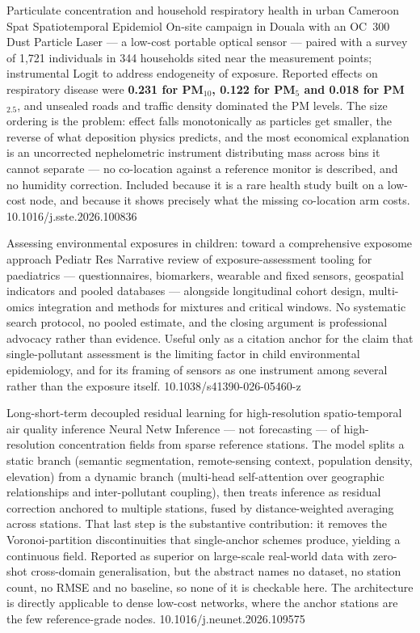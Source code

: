 \documentclass[10pt]{article}
\begin{document}
{Particulate concentration and household respiratory health in urban Cameroon}
{Spat Spatiotemporal Epidemiol}
{On-site campaign in Douala with an OC~300 Dust Particle Laser --- a low-cost portable
optical sensor --- paired with a survey of 1{,}721 individuals in 344 households sited near
the measurement points; instrumental Logit to address endogeneity of exposure. Reported
effects on respiratory disease were \textbf{0.231 for PM$_{10}$, 0.122 for PM$_5$ and 0.018
for PM$_{2.5}$}, and unsealed roads and traffic density dominated the PM levels. The size
ordering is the problem: effect falls monotonically as particles get smaller, the reverse
of what deposition physics predicts, and the most economical explanation is an uncorrected
nephelometric instrument distributing mass across bins it cannot separate --- no
co-location against a reference monitor is described, and no humidity correction. Included
because it is a rare health study built on a low-cost node, and because it shows precisely
what the missing co-location arm costs.}
{10.1016/j.sste.2026.100836}

{Assessing environmental exposures in children: toward a comprehensive exposome approach}
{Pediatr Res}
{Narrative review of exposure-assessment tooling for paediatrics --- questionnaires,
biomarkers, wearable and fixed sensors, geospatial indicators and pooled databases ---
alongside longitudinal cohort design, multi-omics integration and methods for mixtures and
critical windows. No systematic search protocol, no pooled estimate, and the closing
argument is professional advocacy rather than evidence. Useful only as a citation anchor
for the claim that single-pollutant assessment is the limiting factor in child
environmental epidemiology, and for its framing of sensors as one instrument among several
rather than the exposure itself.}
{10.1038/s41390-026-05460-z}


{Long-short-term decoupled residual learning for high-resolution spatio-temporal air
quality inference}
{Neural Netw}
{Inference --- not forecasting --- of high-resolution concentration fields from sparse
reference stations. The model splits a static branch (semantic segmentation, remote-sensing
context, population density, elevation) from a dynamic branch (multi-head self-attention
over geographic relationships and inter-pollutant coupling), then treats inference as
residual correction anchored to multiple stations, fused by distance-weighted averaging
across stations. That last step is the substantive contribution: it removes the
Voronoi-partition discontinuities that single-anchor schemes produce, yielding a continuous
field. Reported as superior on large-scale real-world data with zero-shot cross-domain
generalisation, but the abstract names no dataset, no station count, no RMSE and no
baseline, so none of it is checkable here. The architecture is directly applicable to
dense low-cost networks, where the anchor stations are the few reference-grade nodes.}
{10.1016/j.neunet.2026.109575}
\end{document}
